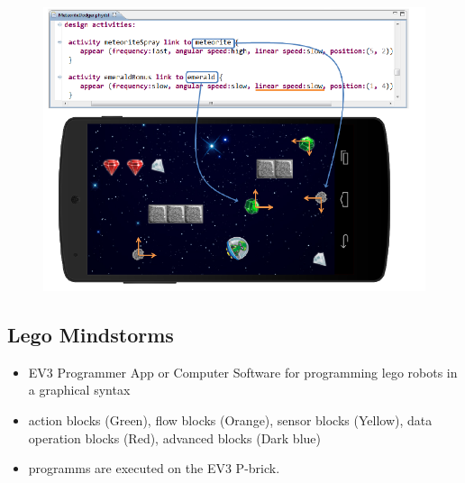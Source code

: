 \documentclass[runningheads,a4paper]{llncs}
\begin{document}
  \begin{figure}[htbp]
      \centering
      \includegraphics[width=\textwidth]{images/PhyDSL3.PNG}
    \end{figure}
  
   \subsection{Lego Mindstorms}
  \begin{itemize}
  \item EV3 Programmer App or Computer Software for programming lego robots in a graphical syntax 
  \item action blocks (Green), flow blocks (Orange), sensor blocks (Yellow), data operation blocks (Red), advanced blocks (Dark blue)
  \item programms are executed on the EV3 P-brick. 
  \end{itemize}
  
\end{document}
